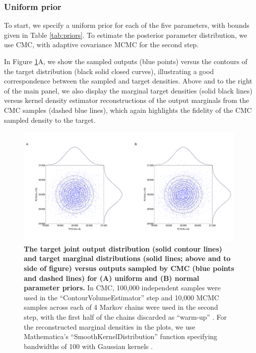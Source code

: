 \subsubsection{Uniform prior}
To start, we specify a uniform prior for each of the five parameters, with bounds given in Table \ref{tab:priors}. To estimate the posterior parameter distribution, we use CMC, with adaptive covariance MCMC \cite{johnstone2016uncertainty} for the second step.

In Figure \ref{fig:growth_factor_outputs}A, we show the sampled outputs (blue points) versus the contours of the target distribution (black solid closed curves), illustrating a good correspondence between the sampled and target densities. Above and to the right of the main panel, we also display the marginal target densities (solid black lines) versus kernel density estimator reconstructions of the output marginals from the CMC samples (dashed blue lines), which again highlights the fidelity of the CMC sampled density to the target.

\begin{figure}[H]
	\centerline{\includegraphics[width=\textwidth]{../figures/growth_factor_outputs.pdf}}
	\caption{\textbf{The target joint output distribution (solid contour lines) and target marginal distributions (solid lines; above and to side of figure) versus outputs sampled by CMC (blue points and dashed lines) for (A) uniform and (B) normal parameter priors.} In CMC, 100,000 independent samples were used in the ``ContourVolumeEstimator'' step and 10,000 MCMC samples across each of 4 Markov chains were used in the second step, with the first half of the chains discarded as ``warm-up'' \cite{lambert2018Student}. For the reconstructed marginal densities in the plots, we use Mathematica's ``SmoothKernelDistribution'' function specifying bandwidths of 100 with Gaussian kernels \cite{mathematica}.}
	\label{fig:growth_factor_outputs}
\end{figure}

